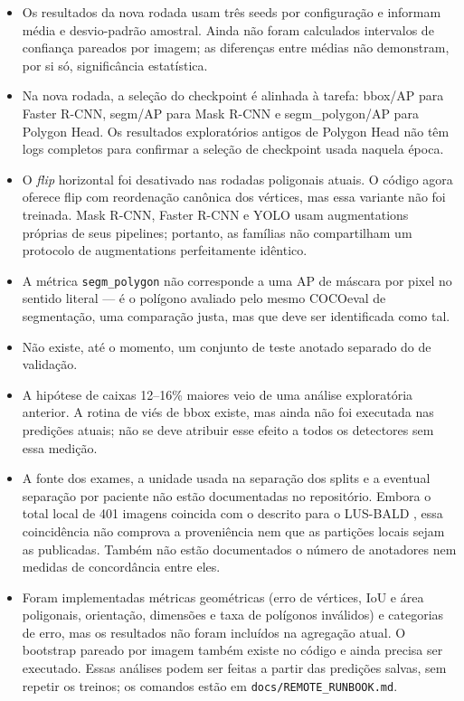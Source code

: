 \documentclass[11pt]{article}
\begin{document}
\begin{itemize}
\item Os resultados da nova rodada usam três seeds por configuração e informam
média e desvio-padrão amostral. Ainda não foram calculados intervalos de confiança
pareados por imagem; as diferenças entre médias não demonstram, por si só,
significância estatística.

\item Na nova rodada, a seleção do checkpoint é alinhada à tarefa: bbox/AP para
Faster R-CNN, segm/AP para Mask R-CNN e segm\_polygon/AP para Polygon Head. Os
resultados exploratórios antigos de Polygon Head não têm logs completos para
confirmar a seleção de checkpoint usada naquela época.

\item O \textit{flip} horizontal foi desativado nas rodadas poligonais atuais.
O código agora oferece flip com reordenação canônica dos vértices, mas essa
variante não foi treinada. Mask R-CNN, Faster R-CNN e YOLO usam augmentations
próprias de seus pipelines; portanto, as famílias não compartilham um protocolo
de augmentations perfeitamente idêntico.

\item A métrica \texttt{segm\_polygon} não corresponde a uma AP de máscara por
pixel no sentido literal --- é o polígono avaliado pelo mesmo COCOeval de
segmentação, uma comparação justa, mas que deve ser identificada como tal.

\item Não existe, até o momento, um conjunto de teste anotado separado do de
validação.

\item A hipótese de caixas 12--16\% maiores veio de uma análise exploratória
anterior. A rotina de viés de bbox existe, mas ainda não foi executada nas
predições atuais; não se deve atribuir esse efeito a todos os detectores sem essa
medição.

\item A fonte dos exames, a unidade usada na separação dos splits e a eventual
separação por paciente não estão documentadas no repositório. Embora o total local
de 401 imagens coincida com o descrito para o LUS-BALD \cite{lusbald2025}, essa
coincidência não comprova a proveniência nem que as partições locais sejam as
publicadas. Também não estão documentados o número de anotadores nem medidas de
concordância entre eles.

\item Foram implementadas métricas geométricas (erro de vértices, IoU e área
poligonais, orientação, dimensões e taxa de polígonos inválidos) e categorias de
erro, mas os resultados não foram incluídos na agregação atual. O bootstrap
pareado por imagem também existe no código e ainda precisa ser executado. Essas
análises podem ser feitas a partir das predições salvas, sem repetir os treinos;
os comandos estão em \texttt{docs/REMOTE\_RUNBOOK.md}.


\end{itemize}
\end{document}
